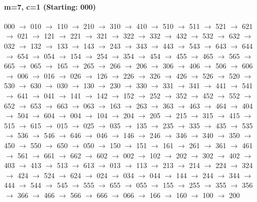 \paragraph{m=7, c=1 (Starting: 000)}


000 $\rightarrow$ 010 $\rightarrow$ 110 $\rightarrow$ 210 $\rightarrow$ 310 $\rightarrow$ 410 $\rightarrow$ 510 $\rightarrow$ 511 $\rightarrow$ 521 $\rightarrow$ 621 $\rightarrow$ 021 $\rightarrow$ 121 $\rightarrow$ 221 $\rightarrow$ 321 $\rightarrow$ 322 $\rightarrow$ 332 $\rightarrow$ 432 $\rightarrow$ 532 $\rightarrow$ 632 $\rightarrow$ 032 $\rightarrow$ 132 $\rightarrow$ 133 $\rightarrow$ 143 $\rightarrow$ 243 $\rightarrow$ 343 $\rightarrow$ 443 $\rightarrow$ 543 $\rightarrow$ 643 $\rightarrow$ 644 $\rightarrow$ 654 $\rightarrow$ 054 $\rightarrow$ 154 $\rightarrow$ 254 $\rightarrow$ 354 $\rightarrow$ 454 $\rightarrow$ 455 $\rightarrow$ 465 $\rightarrow$ 565 $\rightarrow$ 665 $\rightarrow$ 065 $\rightarrow$ 165 $\rightarrow$ 265 $\rightarrow$ 266 $\rightarrow$ 206 $\rightarrow$ 306 $\rightarrow$ 406 $\rightarrow$ 506 $\rightarrow$ 606 $\rightarrow$ 006 $\rightarrow$ 016 $\rightarrow$ 026 $\rightarrow$ 126 $\rightarrow$ 226 $\rightarrow$ 326 $\rightarrow$ 426 $\rightarrow$ 526 $\rightarrow$ 520 $\rightarrow$ 530 $\rightarrow$ 630 $\rightarrow$ 030 $\rightarrow$ 130 $\rightarrow$ 230 $\rightarrow$ 330 $\rightarrow$ 331 $\rightarrow$ 341 $\rightarrow$ 441 $\rightarrow$ 541 $\rightarrow$ 641 $\rightarrow$ 041 $\rightarrow$ 141 $\rightarrow$ 142 $\rightarrow$ 152 $\rightarrow$ 252 $\rightarrow$ 352 $\rightarrow$ 452 $\rightarrow$ 552 $\rightarrow$ 652 $\rightarrow$ 653 $\rightarrow$ 663 $\rightarrow$ 063 $\rightarrow$ 163 $\rightarrow$ 263 $\rightarrow$ 363 $\rightarrow$ 463 $\rightarrow$ 464 $\rightarrow$ 404 $\rightarrow$ 504 $\rightarrow$ 604 $\rightarrow$ 004 $\rightarrow$ 104 $\rightarrow$ 204 $\rightarrow$ 205 $\rightarrow$ 215 $\rightarrow$ 315 $\rightarrow$ 415 $\rightarrow$ 515 $\rightarrow$ 615 $\rightarrow$ 015 $\rightarrow$ 025 $\rightarrow$ 035 $\rightarrow$ 135 $\rightarrow$ 235 $\rightarrow$ 335 $\rightarrow$ 435 $\rightarrow$ 535 $\rightarrow$ 536 $\rightarrow$ 546 $\rightarrow$ 646 $\rightarrow$ 046 $\rightarrow$ 146 $\rightarrow$ 246 $\rightarrow$ 346 $\rightarrow$ 340 $\rightarrow$ 350 $\rightarrow$ 450 $\rightarrow$ 550 $\rightarrow$ 650 $\rightarrow$ 050 $\rightarrow$ 150 $\rightarrow$ 151 $\rightarrow$ 161 $\rightarrow$ 261 $\rightarrow$ 361 $\rightarrow$ 461 $\rightarrow$ 561 $\rightarrow$ 661 $\rightarrow$ 662 $\rightarrow$ 602 $\rightarrow$ 002 $\rightarrow$ 102 $\rightarrow$ 202 $\rightarrow$ 302 $\rightarrow$ 402 $\rightarrow$ 403 $\rightarrow$ 413 $\rightarrow$ 513 $\rightarrow$ 613 $\rightarrow$ 013 $\rightarrow$ 113 $\rightarrow$ 213 $\rightarrow$ 214 $\rightarrow$ 224 $\rightarrow$ 324 $\rightarrow$ 424 $\rightarrow$ 524 $\rightarrow$ 624 $\rightarrow$ 024 $\rightarrow$ 034 $\rightarrow$ 044 $\rightarrow$ 144 $\rightarrow$ 244 $\rightarrow$ 344 $\rightarrow$ 444 $\rightarrow$ 544 $\rightarrow$ 545 $\rightarrow$ 555 $\rightarrow$ 655 $\rightarrow$ 055 $\rightarrow$ 155 $\rightarrow$ 255 $\rightarrow$ 355 $\rightarrow$ 356 $\rightarrow$ 366 $\rightarrow$ 466 $\rightarrow$ 566 $\rightarrow$ 666 $\rightarrow$ 066 $\rightarrow$ 166 $\rightarrow$ 160 $\rightarrow$ 100 $\rightarrow$ 200 